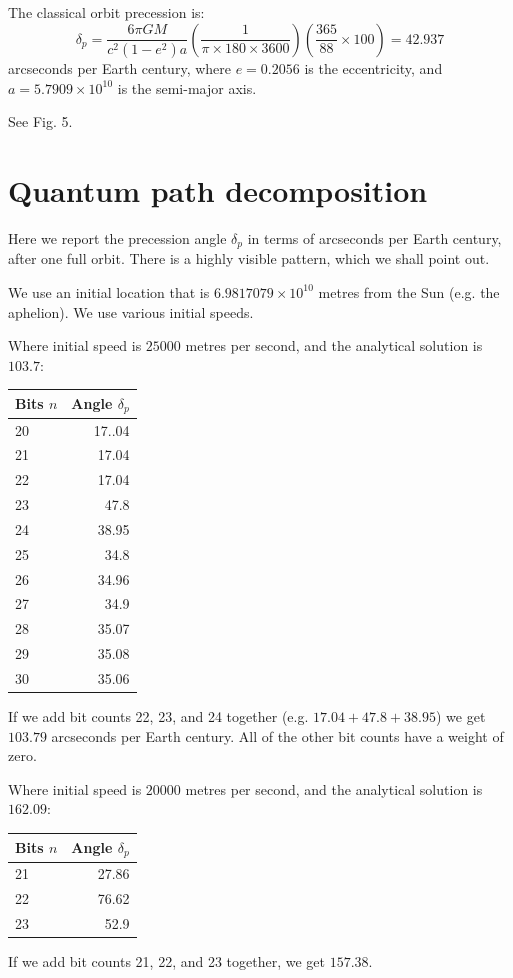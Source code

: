 \documentclass[12pt]{article}
\begin{document}
The classical orbit precession is:
\begin{equation}
\label{delta_p}
\delta_{p} = \frac{6 \pi G M}{c^2 (1 - e^2) a} \left( \frac{1}{ \pi \times 180 \times 3600} \right) \left( \frac{365}{88} \times 100 \right) = 42.937
\end{equation}
arcseconds per Earth century, where $e = 0.2056$ is the eccentricity, and $a = 5.7909 \times 10^{10}$ is the semi-major axis.

See Fig. 5.


\section{Quantum path decomposition}

Here we report the precession angle $\delta_{p}$ in terms of arcseconds per Earth century, after one full orbit.
There is a highly visible pattern, which we shall point out.

We use an initial location that is $6.9817079 \times 10^{10}$ metres from the Sun (e.g. the aphelion).
We use various initial speeds.

Where initial speed is $25000$ metres per second, and the analytical solution is $103.7$:
\begin{center}
\begin{tabular}{| l | r |}
  \hline
Bits $n$ & Angle $\delta_{p}$ \\
\hline
\hline
20 & 17..04 \\
21 & 17.04 \\
22 & 17.04 \\
23 & 47.8 \\
24 & 38.95 \\
25 & 34.8 \\
26 & 34.96 \\
27 & 34.9 \\
28 & 35.07 \\
29 & 35.08 \\
30 & 35.06 \\
  \hline  
\end{tabular}
\end{center}
If we add bit counts 22, 23, and 24 together (e.g. $17.04 + 47.8 + 38.95$) we get $103.79$ arcseconds per Earth century.
All of the other bit counts have a weight of zero.

Where initial speed is $20000$ metres per second, and the analytical solution is $162.09$:
\begin{center}
\begin{tabular}{| l | r |}
  \hline
Bits $n$ & Angle $\delta_{p}$\\
\hline
\hline
21 & 27.86 \\
22 & 76.62 \\
23 & 52.9 \\
  \hline  
\end{tabular}
\end{center}
If we add bit counts 21, 22, and 23 together, we get $157.38$.
\end{document}
